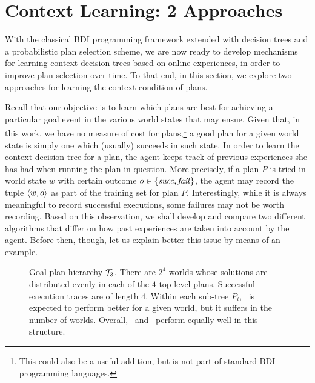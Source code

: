 \section{Context Learning: 2 Approaches}\label{sec:context_learning}

\newcommand{\success}{\mbox{\emph{succ}}}
\newcommand{\failure}{\mbox{\emph{fail}}}

With the classical BDI programming framework extended with decision trees and a
probabilistic plan selection scheme, we are now ready to develop mechanisms for
learning context decision trees
based on online experiences, in order to improve plan selection over time.
To that end, in this section, we explore two approaches for learning the context
condition of plans.



Recall that our objective is to learn which plans are best for achieving
a particular goal event in the various world states that may ensue. Given that,
in this work, we have no measure of cost for plans,\footnote{This could also be a
useful addition, but is not part of standard BDI programming languages.} a good
plan for a given world state is simply one which (usually) succeeds in such
state. In order to learn the context decision tree for a plan, the agent keeps
track of previous experiences she has had when running the plan in question. More
precisely, if a plan $P$ is tried in world state $w$ with certain outcome $o \in
\{\success,\failure\}$, the agent may record the tuple $\langle w,o \rangle$ as part of
the training set for plan $P$.
Interestingly, while it is always meaningful to record successful executions,
some failures may not be worth recording. Based on this observation, we shall
develop and compare two different algorithms that differ on how past experiences
are taken into account by the agent. Before then, though, let us explain better
this issue by means of an example.
 

\begin{figure}[t]
\begin{center}

\end{center}
\caption{Goal-plan hierarchy ${\mathcal{T}}_3$. There are $2^4$ worlds whose solutions are
distributed evenly in each of the $4$ top level plans. Successful execution
traces are of length $4$. Within each sub-tree $P_i$, \BUL\ is expected to
perform better for a given world, but it suffers in the number of worlds. Overall, \CL\ and \BUL\
perform equally well in this structure.}
\label{fig:T3}
\end{figure}



